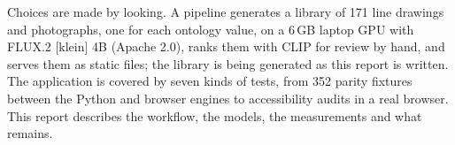 \documentclass[11pt,oneside,openany]{book}
\begin{document}
Choices are made by looking. A pipeline generates a library of 171 line drawings and photographs, one for each ontology value, on a 6\,GB laptop GPU with FLUX.2 [klein] 4B (Apache 2.0), ranks them with CLIP for review by hand, and serves them as static files; the library is being generated as this report is written. The application is covered by seven kinds of tests, from 352 parity fixtures between the Python and browser engines to accessibility audits in a real browser. This report describes the workflow, the models, the measurements and what remains.

\cleardoublepage
\tableofcontents

\mainmatter
\pagestyle{body}









\backmatter

\end{document}
